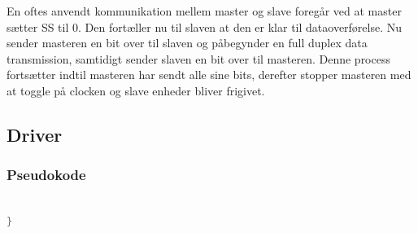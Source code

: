 En oftes anvendt kommunikation mellem master og slave foregår ved at master sætter SS til 0. Den fortæller nu til slaven at den er klar til 
dataoverførelse. Nu sender masteren en bit over til slaven og påbegynder en full duplex data transmission, samtidigt sender slaven en bit over
til masteren. Denne process fortsætter indtil masteren har sendt alle sine bits, derefter stopper masteren med at toggle på clocken og slave 
enheder bliver frigivet.

\subsection{Driver}



\subsubsection*{Pseudokode}

\begin{lstlisting}[language=C]

}
\end{lstlisting}